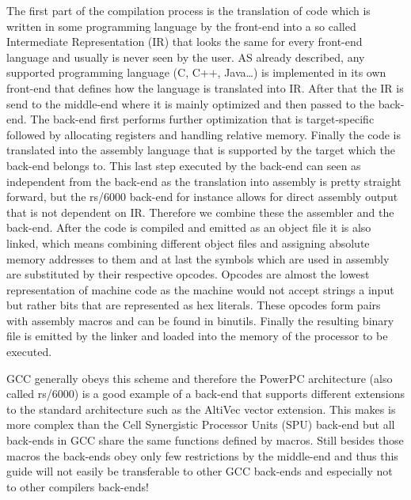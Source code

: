 \vspace{\baselineskip}
The first part of the compilation process is the translation of code which is written in some programming language by the front-end into a so called Intermediate Representation (IR) that looks the same for every front-end language and usually is never seen by the user. AS already described, any supported programming language (C, C++, Java…) is implemented in its own front-end that defines how the language is translated into IR. After that the IR is send to the middle-end where it is mainly optimized and then passed to the back-end. The back-end first performs further optimization that is target-specific followed by allocating registers and handling relative memory. Finally the code is translated into the assembly language that is supported by the target which the back-end belongs to.
This last step executed by the back-end can seen as independent from the back-end as the translation into assembly is pretty straight forward, but the rs/6000 back-end for instance allows for direct assembly output that is not dependent on IR. Therefore we combine these the assembler and the back-end.
After the code is compiled and emitted as an object file it is also linked, which means combining different object files and assigning absolute memory addresses to them and at last the symbols which are used in assembly are substituted by their respective opcodes. Opcodes are almost the lowest representation of machine code as the machine would not accept strings a input but rather bits that are represented as hex literals. These opcodes form pairs with assembly macros and can be found in binutils. Finally the resulting binary file is emitted by the linker and loaded into the memory of the processor to be executed.

GCC generally obeys this scheme and therefore the PowerPC architecture (also called rs/6000) is a good example of a back-end that supports different extensions to the standard architecture such as the AltiVec vector extension. This makes is more complex than the Cell Synergistic Processor Units (SPU) back-end but all back-ends in GCC share the same functions defined by macros. Still besides those macros the back-ends obey only few restrictions by the middle-end and thus this guide will not easily be transferable to other GCC back-ends and especially not to other compilers back-ends!